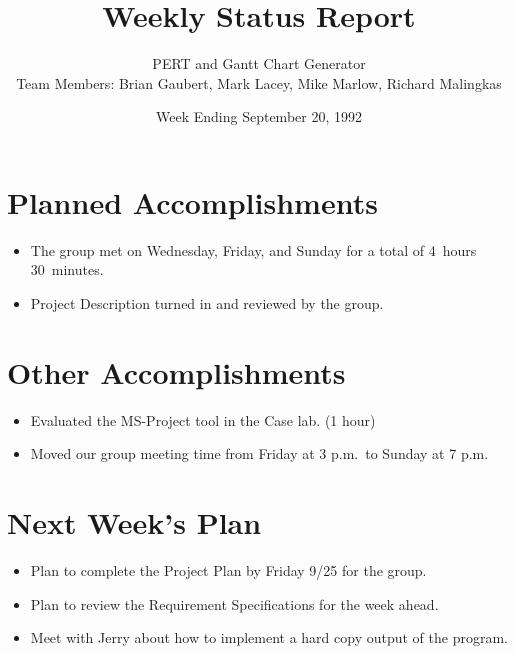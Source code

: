 
\title{Weekly Status Report}
\author{PERT and Gantt Chart Generator \\
Team Members: Brian Gaubert, Mark Lacey, Mike Marlow, Richard Malingkas}
\date{Week Ending September 20, 1992}
\maketitle

%
%
%
\section{Planned Accomplishments}
\begin{itemize}
\item The group met on Wednesday, Friday, and Sunday for a total of
4~hours 30~minutes.
\item Project Description turned in and reviewed by the group.
\end{itemize}

%
%
%
\section{Other Accomplishments}
\begin{itemize}
\item Evaluated the MS-Project tool in the Case lab. (1 hour)
\item Moved our group meeting time from Friday at 3 {\sc p.m.}\ to
Sunday at 7 {\sc p.m.}
\end{itemize}

%
%
%
\section{Next Week's Plan}
\begin{itemize}
\item Plan to complete the Project Plan by Friday 9/25 for the group.
\item Plan to review the Requirement Specifications for the week ahead.
\item Meet with Jerry about how to implement a hard copy output of the program.
\end{itemize}

